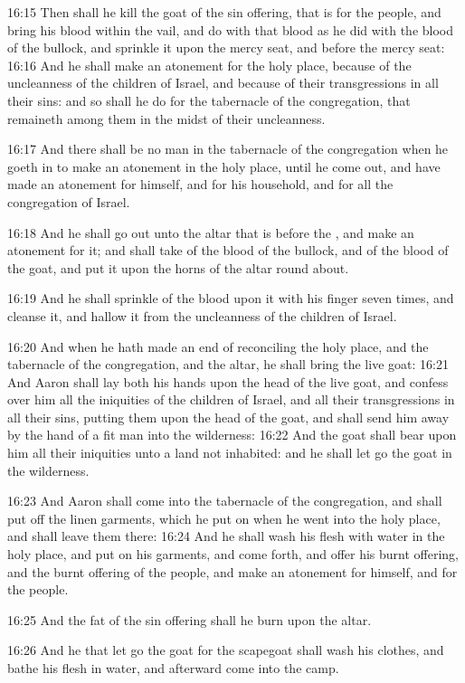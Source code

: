 16:15 Then shall he kill the goat of the sin offering, that is for the
people, and bring his blood within the vail, and do with that blood as
he did with the blood of the bullock, and sprinkle it upon the mercy
seat, and before the mercy seat: 16:16 And he shall make an atonement
for the holy place, because of the uncleanness of the children of
Israel, and because of their transgressions in all their sins: and so
shall he do for the tabernacle of the congregation, that remaineth
among them in the midst of their uncleanness.

16:17 And there shall be no man in the tabernacle of the congregation
when he goeth in to make an atonement in the holy place, until he come
out, and have made an atonement for himself, and for his household,
and for all the congregation of Israel.

16:18 And he shall go out unto the altar that is before the \LORD, and
make an atonement for it; and shall take of the blood of the bullock,
and of the blood of the goat, and put it upon the horns of the altar
round about.

16:19 And he shall sprinkle of the blood upon it with his finger seven
times, and cleanse it, and hallow it from the uncleanness of the
children of Israel.

16:20 And when he hath made an end of reconciling the holy place, and
the tabernacle of the congregation, and the altar, he shall bring the
live goat: 16:21 And Aaron shall lay both his hands upon the head of
the live goat, and confess over him all the iniquities of the children
of Israel, and all their transgressions in all their sins, putting
them upon the head of the goat, and shall send him away by the hand of
a fit man into the wilderness: 16:22 And the goat shall bear upon him
all their iniquities unto a land not inhabited: and he shall let go
the goat in the wilderness.

16:23 And Aaron shall come into the tabernacle of the congregation,
and shall put off the linen garments, which he put on when he went
into the holy place, and shall leave them there: 16:24 And he shall
wash his flesh with water in the holy place, and put on his garments,
and come forth, and offer his burnt offering, and the burnt offering
of the people, and make an atonement for himself, and for the people.

16:25 And the fat of the sin offering shall he burn upon the altar.

16:26 And he that let go the goat for the scapegoat shall wash his
clothes, and bathe his flesh in water, and afterward come into the
camp.

